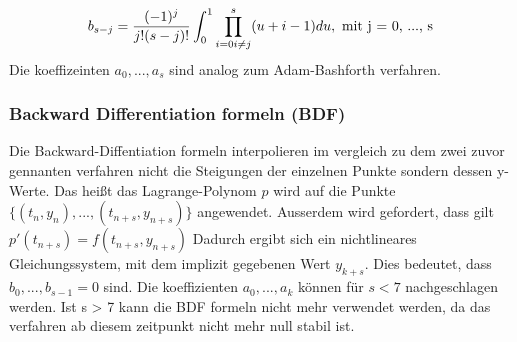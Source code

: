 $$
b_{s - j} = \frac{(-1)^j}{j!(s - j)!} \int_0^{1} \prod_{i = 0 \\ i \neq j}^{s} (u + i - 1) du, \text{ mit j = 0, ..., s}
$$
Die koeffizeinten $a_0, ..., a_s$ sind analog zum Adam-Bashforth verfahren.


\subsubsection{Backward Differentiation formeln (BDF)} \label{sec:bdf}

Die Backward-Diffentiation formeln interpolieren im vergleich zu dem zwei zuvor gennanten verfahren nicht 
die Steigungen der einzelnen Punkte sondern dessen y-Werte.
Das heißt das Lagrange-Polynom $p$ wird auf die Punkte $\{ (t_n, y_n), ..., (t_{n + s}, y_{n + s}) \}$ angewendet.
Ausserdem wird gefordert, dass gilt $p'(t_{n + s}) = f(t_{n + s}, y_{n + s})$
Dadurch ergibt sich ein nichtlineares Gleichungssystem, mit dem implizit gegebenen Wert $y_{k + s}$.
Dies bedeutet, dass $b_0, ...,b_{s - 1} = 0$ sind.
Die koeffizienten $a_0, ..., a_k$ können für $s < 7$ nachgeschlagen werden.
Ist s  > 7 kann die BDF formeln nicht mehr verwendet werden, da das verfahren ab diesem zeitpunkt nicht mehr null stabil ist.



